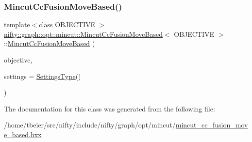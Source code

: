 \mbox{\label{classnifty_1_1graph_1_1opt_1_1mincut_1_1MincutCcFusionMoveBased_a90c20c7e0d74535b6b2cc8faf66f8753}} 
\subsubsection{\texorpdfstring{Mincut\+Cc\+Fusion\+Move\+Based()}{MincutCcFusionMoveBased()}}
{\footnotesize\ttfamily template$<$class O\+B\+J\+E\+C\+T\+I\+VE $>$ \\
\hyperlink{classnifty_1_1graph_1_1opt_1_1mincut_1_1MincutCcFusionMoveBased}{nifty\+::graph\+::opt\+::mincut\+::\+Mincut\+Cc\+Fusion\+Move\+Based}$<$ O\+B\+J\+E\+C\+T\+I\+VE $>$\+::\hyperlink{classnifty_1_1graph_1_1opt_1_1mincut_1_1MincutCcFusionMoveBased}{Mincut\+Cc\+Fusion\+Move\+Based} (\begin{DoxyParamCaption}\item[{const \hyperlink{classnifty_1_1graph_1_1opt_1_1mincut_1_1MincutCcFusionMoveBased_a59dd78b1fd2c3ed4f4b969e1d791ae0f}{Objective\+Type} \&}]{objective,  }\item[{const \hyperlink{classnifty_1_1graph_1_1opt_1_1mincut_1_1MincutCcFusionMoveBased_a28a85c9732f7bf4b309560aeb66f40a5}{Settings\+Type} \&}]{settings = {\ttfamily \hyperlink{classnifty_1_1graph_1_1opt_1_1mincut_1_1MincutCcFusionMoveBased_a28a85c9732f7bf4b309560aeb66f40a5}{Settings\+Type}()} }\end{DoxyParamCaption})\hspace{0.3cm}{\ttfamily [inline]}}



The documentation for this class was generated from the following file\+:\begin{DoxyCompactItemize}
\item 
/home/tbeier/src/nifty/include/nifty/graph/opt/mincut/\hyperlink{mincut__cc__fusion__move__based_8hxx}{mincut\+\_\+cc\+\_\+fusion\+\_\+move\+\_\+based.\+hxx}\end{DoxyCompactItemize}
